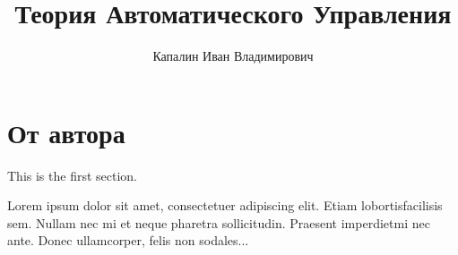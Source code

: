 \documentclass[a4paper,12pt]{extreport}
\title{Теория Автоматического Управления}
\author{Капалин Иван Владимирович}
\date{}
\theoremstyle{plain}
\theoremstyle{definition}
\theoremstyle{remark}
\theoremstyle{plain}
\begin{document}
\maketitle

\tableofcontents

\chapter*{От автора}

This is the first section.
 
Lorem  ipsum  dolor  sit  amet,  consectetuer  adipiscing  
elit.   Etiam  lobortisfacilisis sem.  Nullam nec mi et 
neque pharetra sollicitudin.  Praesent imperdietmi nec ante. 
Donec ullamcorper, felis non sodales...




\end{document}
